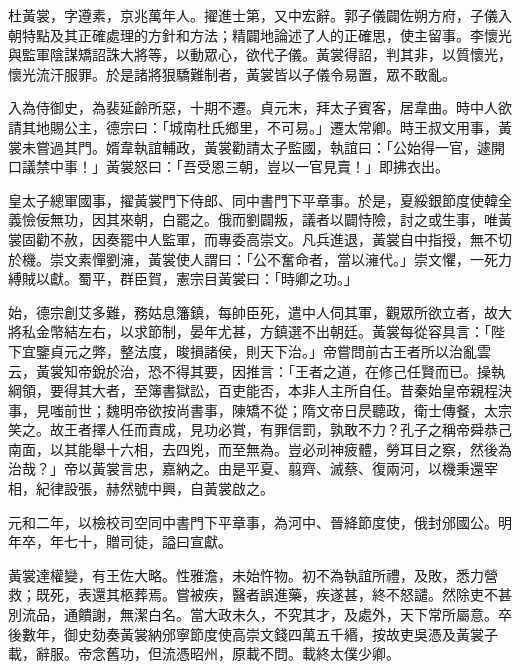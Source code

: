 
\begin{pinyinscope}

 杜黃裳，字遵素，京兆萬年人。擢進士第，又中宏辭。郭子儀闢佐朔方府，子儀入朝特點及其正確處理的方針和方法；精闢地論述了人的正確思，使主留事。李懷光與監軍陰謀矯詔誅大將等，以動眾心，欲代子儀。黃裳得詔，判其非，以質懷光，懷光流汗服罪。於是諸將狠驕難制者，黃裳皆以子儀令易置，眾不敢亂。



 入為侍御史，為裴延齡所惡，十期不遷。貞元末，拜太子賓客，居韋曲。時中人欲請其地賜公主，德宗曰：「城南杜氏鄉里，不可易。」遷太常卿。時王叔文用事，黃裳未嘗過其門。婿韋執誼輔政，黃裳勸請太子監國，執誼曰：「公始得一官，遽開口議禁中事！」黃裳怒曰：「吾受恩三朝，豈以一官見賣！」即拂衣出。



 皇太子總軍國事，擢黃裳門下侍郎、同中書門下平章事。於是，夏綏銀節度使韓全義憸佞無功，因其來朝，白罷之。俄而劉闢叛，議者以闢恃險，討之或生事，唯黃裳固勸不赦，因奏罷中人監軍，而專委高崇文。凡兵進退，黃裳自中指授，無不切於機。崇文素憚劉澭，黃裳使人謂曰：「公不奮命者，當以澭代。」崇文懼，一死力縛賊以獻。蜀平，群臣賀，憲宗目黃裳曰：「時卿之功。」



 始，德宗創艾多難，務姑息籓鎮，每帥臣死，遣中人伺其軍，觀眾所欲立者，故大將私金幣結左右，以求節制，晏年尤甚，方鎮選不出朝廷。黃裳每從容具言：「陛下宜鑒貞元之弊，整法度，晙損諸侯，則天下治。」帝嘗問前古王者所以治亂雲云，黃裳知帝銳於治，恐不得其要，因推言：「王者之道，在修己任賢而已。操執綱領，要得其大者，至簿書獄訟，百吏能否，本非人主所自任。昔秦始皇帝親程決事，見嗤前世；魏明帝欲按尚書事，陳矯不從；隋文帝日昃聽政，衛士傳餐，太宗笑之。故王者擇人任而責成，見功必賞，有罪信罰，孰敢不力？孔子之稱帝舜恭己南面，以其能舉十六相，去四兇，而至無為。豈必刓神疲體，勞耳目之察，然後為治哉？」帝以黃裳言忠，嘉納之。由是平夏、翦齊、滅蔡、復兩河，以機秉還宰相，紀律設張，赫然號中興，自黃裳啟之。



 元和二年，以檢校司空同中書門下平章事，為河中、晉絳節度使，俄封邠國公。明年卒，年七十，贈司徒，謚曰宣獻。



 黃裳達權變，有王佐大略。性雅澹，未始忤物。初不為執誼所禮，及敗，悉力營救；既死，表還其柩葬焉。嘗被疾，醫者誤進藥，疾遂甚，終不怒譴。然除吏不甚別流品，通饋謝，無潔白名。當大政未久，不究其才，及處外，天下常所屬意。卒後數年，御史劾奏黃裳納邠寧節度使高崇文錢四萬五千緡，按故吏吳憑及黃裳子載，辭服。帝念舊功，但流憑昭州，原載不問。載終太僕少卿。




\end{pinyinscope}
